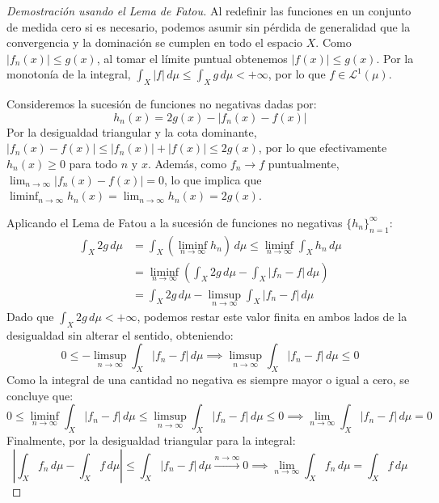 \begin{proof}[Demostración usando el Lema de Fatou]
	Al redefinir las funciones en un conjunto de medida cero si es necesario, podemos asumir sin pérdida de generalidad que la convergencia y la dominación se cumplen en todo el espacio $X$.
	Como $|f_n(x)| \le g(x)$, al tomar el límite puntual obtenemos $|f(x)| \le g(x)$. Por la monotonía de la integral, $\int_X |f| \, d\mu \le \int_X g \, d\mu < +\infty$, por lo que $f \in \mathcal{L}^1(\mu)$.
	
	Consideremos la sucesión de funciones no negativas dadas por:
	$$ h_n(x) = 2g(x) - |f_n(x) - f(x)| $$
	Por la desigualdad triangular y la cota dominante, $|f_n(x) - f(x)| \le |f_n(x)| + |f(x)| \le 2g(x)$, por lo que efectivamente $h_n(x) \ge 0$ para todo $n$ y $x$. Además, como $f_n \to f$ puntualmente, $\lim_{n \to \infty} |f_n(x) - f(x)| = 0$, lo que implica que $\liminf_{n \to \infty} h_n(x) = \lim_{n \to \infty} h_n(x) = 2g(x)$.
	
	Aplicando el Lema de Fatou a la sucesión de funciones no negativas $\{h_n\}_{n=1}^\infty$:
	\begin{align*}
		\int_X 2g \, d\mu &= \int_X \left( \liminf_{n \to \infty} h_n \right) \, d\mu \le \liminf_{n \to \infty} \int_X h_n \, d\mu \\
		&= \liminf_{n \to \infty} \left( \int_X 2g \, d\mu - \int_X |f_n - f| \, d\mu \right) \\
		&= \int_X 2g \, d\mu - \limsup_{n \to \infty} \int_X |f_n - f| \, d\mu
	\end{align*}
	Dado que $\int_X 2g \, d\mu < +\infty$, podemos restar este valor finita en ambos lados de la desigualdad sin alterar el sentido, obteniendo:
	$$ 0 \le -\limsup_{n \to \infty} \int_X |f_n - f| \, d\mu \implies \limsup_{n \to \infty} \int_X |f_n - f| \, d\mu \le 0 $$
	Como la integral de una cantidad no negativa es siempre mayor o igual a cero, se concluye que:
	$$ 0 \le \liminf_{n \to \infty} \int_X |f_n - f| \, d\mu \le \limsup_{n \to \infty} \int_X |f_n - f| \, d\mu \le 0 \implies \lim_{n \to \infty} \int_X |f_n - f| \, d\mu = 0 $$
	Finalmente, por la desigualdad triangular para la integral:
	$$ \left| \int_X f_n \, d\mu - \int_X f \, d\mu \right| \le \int_X |f_n - f| \, d\mu \xrightarrow{n \to \infty} 0 \implies \lim_{n \to \infty} \int_X f_n \, d\mu = \int_X f \, d\mu $$
\end{proof}

